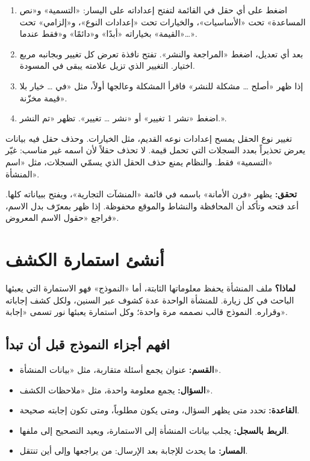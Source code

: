 \begin{enumerate}
\item اضغط على أي حقل في القائمة لتفتح إعداداته على اليسار: «التسمية» و«نص المساعدة» تحت «الأساسيات»، والخيارات تحت «إعدادات النوع»، و«إلزامي» تحت «القيمة» بخياراته «أبدًا» و«دائمًا» و«فقط عندما…».
\item بعد أي تعديل، اضغط «المراجعة والنشر». تفتح نافذة تعرض كل تغيير وبجانبه مربع اختيار. التغيير الذي تزيل علامته يبقى في المسودة.
\item إذا ظهر «أصلح … مشكلة للنشر» فاقرأ المشكلة وعالجها أولاً، مثل «في … خيار بلا قيمة مخزّنة».
\item اضغط «نشر 1 تغيير» أو «نشر … تغيير». تظهر «تم النشر.».
\end{enumerate}

\begin{rcwarn}
تغيير نوع الحقل يمسح إعدادات نوعه القديم، مثل الخيارات. وحذف حقل فيه بيانات يعرض تحذيراً بعدد السجلات التي تحمل قيمة. لا تحذف حقلاً لأن اسمه غير مناسب: غيّر «التسمية» فقط. والنظام يمنع حذف الحقل الذي يسمّي السجلات، مثل «اسم المنشأة».
\end{rcwarn}

\textbf{تحقق:} يظهر «فرن الأمانة» باسمه في قائمة «المنشآت التجارية»، ويفتح ببياناته كلها. أعد فتحه وتأكد أن المحافظة والنشاط والموقع محفوظة. إذا ظهر بمعرّف بدل الاسم، فراجع «حقول الاسم المعروض».

\section{أنشئ استمارة الكشف}
\label{sec:build-form}

\textbf{لماذا؟} ملف المنشأة يحفظ معلوماتها الثابتة، أما «النموذج» فهو الاستمارة التي يعبئها الباحث في كل زيارة. للمنشأة الواحدة عدة كشوف عبر السنين، ولكل كشف إجاباته وقراره. النموذج قالب نصممه مرة واحدة؛ وكل استمارة يعبئها نور تسمى «إجابة».

\subsection{افهم أجزاء النموذج قبل أن تبدأ}

\begin{itemize}
\item \textbf{القسم:} عنوان يجمع أسئلة متقاربة، مثل «بيانات المنشأة».
\item \textbf{السؤال:} يجمع معلومة واحدة، مثل «ملاحظات الكشف».
\item \textbf{القاعدة:} تحدد متى يظهر السؤال، ومتى يكون مطلوباً، ومتى تكون إجابته صحيحة.
\item \textbf{الربط بالسجل:} يجلب بيانات المنشأة إلى الاستمارة، ويعيد التصحيح إلى ملفها.
\item \textbf{المسار:} ما يحدث للإجابة بعد الإرسال: من يراجعها وإلى أين تنتقل.
\end{itemize}

